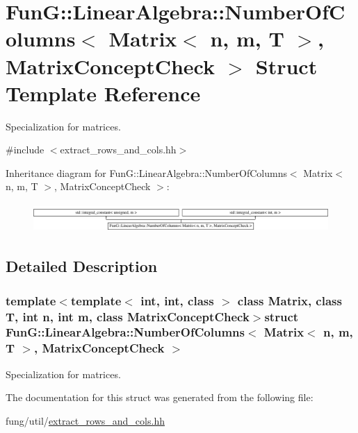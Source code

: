 \hypertarget{structFunG_1_1LinearAlgebra_1_1NumberOfColumns_3_01Matrix_3_01n_00_01m_00_01T_01_4_00_01MatrixConceptCheck_01_4}{\section{\-Fun\-G\-:\-:\-Linear\-Algebra\-:\-:\-Number\-Of\-Columns$<$ \-Matrix$<$ n, m, \-T $>$, \-Matrix\-Concept\-Check $>$ \-Struct \-Template \-Reference}
\label{structFunG_1_1LinearAlgebra_1_1NumberOfColumns_3_01Matrix_3_01n_00_01m_00_01T_01_4_00_01MatrixConceptCheck_01_4}
}


\-Specialization for matrices.  




{\ttfamily \#include $<$extract\-\_\-rows\-\_\-and\-\_\-cols.\-hh$>$}

\-Inheritance diagram for \-Fun\-G\-:\-:\-Linear\-Algebra\-:\-:\-Number\-Of\-Columns$<$ \-Matrix$<$ n, m, \-T $>$, \-Matrix\-Concept\-Check $>$\-:\begin{figure}[H]
\begin{center}
\leavevmode
\includegraphics[height=1.117764cm]{structFunG_1_1LinearAlgebra_1_1NumberOfColumns_3_01Matrix_3_01n_00_01m_00_01T_01_4_00_01MatrixConceptCheck_01_4}
\end{center}
\end{figure}


\subsection{\-Detailed \-Description}
\subsubsection*{template$<$template$<$ int, int, class $>$ class \-Matrix, class T, int n, int m, class Matrix\-Concept\-Check$>$struct Fun\-G\-::\-Linear\-Algebra\-::\-Number\-Of\-Columns$<$ Matrix$<$ n, m, T $>$, Matrix\-Concept\-Check $>$}

\-Specialization for matrices. 

\-The documentation for this struct was generated from the following file\-:\begin{DoxyCompactItemize}
\item 
fung/util/\hyperlink{extract__rows__and__cols_8hh}{extract\-\_\-rows\-\_\-and\-\_\-cols.\-hh}\end{DoxyCompactItemize}
